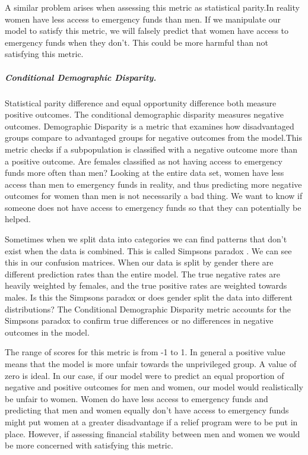 \documentclass[water,article,submit,moreauthors,pdftex]{mdpi}
\begin{document}
A similar problem arises when assessing this metric as statistical
parity.In reality women have less access to emergency funds than men. If
we manipulate our model to satisfy this metric, we will falsely predict
that women have access to emergency funds when they don't. This could be
more harmful than not satisfying this metric.

\hypertarget{conditional-demographic-disparity.}{%
\subparagraph{Conditional Demographic
Disparity.}\label{conditional-demographic-disparity.}}

Statistical parity difference and equal opportunity difference both
measure positive outcomes. The conditional demographic disparity
measures negative outcomes. Demographic Disparity is a metric that
examines how disadvantaged groups compare to advantaged groups for
negative outcomes from the model.This metric checks if a subpopulation
is classified with a negative outcome more than a positive outcome. Are
females classified as not having access to emergency funds more often
than men? Looking at the entire data set, women have less access than
men to emergency funds in reality, and thus predicting more negative
outcomes for women than men is not necessarily a bad thing. We want to
know if someone does not have access to emergency funds so that they can
potentially be helped.

Sometimes when we split data into categories we can find patterns that
don't exist when the data is combined. This is called Simpsons paradox
\citep{mehrabi2021survey}. We can see this in our confusion matrices.
When our data is split by gender there are different prediction rates
than the entire model. The true negative rates are heavily weighted by
females, and the true positive rates are weighted towards males. Is this
the Simpsons paradox or does gender split the data into different
distributions? The Conditional Demographic Disparity metric accounts for
the Simpsons paradox to confirm true differences or no differences in
negative outcomes in the model.

The range of scores for this metric is from -1 to 1. In general a
positive value means that the model is more unfair towards the
unprivileged group. A value of zero is ideal. In our case, if our model
were to predict an equal proportion of negative and positive outcomes
for men and women, our model would realistically be unfair to women.
Women do have less access to emergency funds and predicting that men and
women equally don't have access to emergency funds might put women at a
greater disadvantage if a relief program were to be put in place.
However, if assessing financial stability between men and women we would
be more concerned with satisfying this metric.
\end{document}
